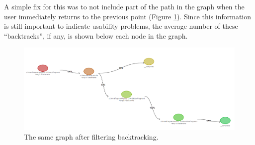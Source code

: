 A simple fix for this was to not include part of the path in the graph when the user immediately returns
to the previous point (Figure \ref{fig:task-navigation-mess-fixed}). Since this information is still important to indicate usability problems, the average number of these ``backtracks'', if any, is shown below each node in the graph.

\begin{figure}
 \centering
 \includegraphics[width=\textwidth]{images/fixed-graph}
 \caption{The same graph after filtering backtracking.}
 \label{fig:task-navigation-mess-fixed}
\end{figure}